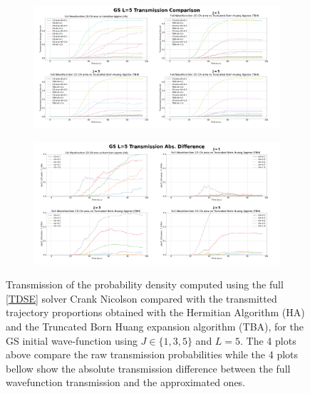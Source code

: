 \documentclass[11pt, a4paper]{article} %
\begin{document}
\begin{figure}[h!]
  \centering
  \begin{subfigure}[b]{1.0\linewidth}
    \includegraphics[width=\linewidth]{Example_Results/GS_L_5_transmission.png}
  \end{subfigure}
  \begin{subfigure}[b]{1.0\linewidth}
    \includegraphics[width=\linewidth]{Example_Results/GS_L_5_errors.png}
  \end{subfigure}

  
  \caption{ Transmission of the probability density computed using the full \ref{TDSE} solver Crank Nicolson compared with the transmitted trajectory proportions obtained with the Hermitian Algorithm (HA) and the Truncated Born Huang expansion algorithm (TBA), for the GS initial wave-function using $J\in\{1,3,5\}$ and $L=5$. The 4 plots above compare the raw transmission probabilities while the 4 plots bellow show the absolute transmission difference between the full wavefunction transmission and the approximated ones.}
  \label{fig:transm_GS_L5}
\end{figure}
\end{document}
